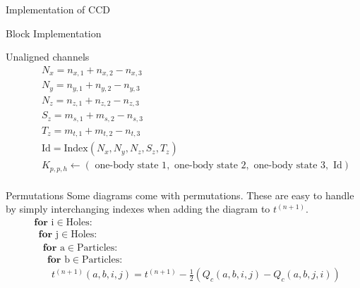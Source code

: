 \documentclass[twoside,english]{uiofysmaster}
\begin{document}
\begin{chapter}{Implementation of CCD}
\begin{section}{Block Implementation}
\begin{subsection}{Unaligned channels}
\begin{align*}
				&\:\:\:\:\:\:\:\: N_x = n_{x,1} + n_{x,2} - n_{x,3}\\
				&\:\:\:\:\:\:\:\: N_y = n_{y,1} + n_{y,2} - n_{y,3}\\
				&\:\:\:\:\:\:\:\: N_z = n_{z,1} + n_{z,2} - n_{z,3}\\
 				&\:\:\:\:\:\:\:\: S_z = m_{s,1} + m_{s,2} - n_{s,3}\\
				&\:\:\:\:\:\:\:\: T_z = m_{t,1} + m_{t,2} - n_{t,3}\\
				&\:\:\:\:\:\:\:\: \text{Id} = \text{Index}(N_x,N_y,N_z,S_z,T_z) \\
				&\:\:\:\:\:\:\:\: K_{p,p,h} \leftarrow (\text{ one-body state 1}, \text{ one-body state 2}, \text{ one-body state 3},  \text{ Id}) \\
			\end{align*}
		\end{subsection}

		\begin{subsection}{Permutations}
			Some diagrams come with permutations. These are easy to handle by simply interchanging indexes when adding the diagram to $t^{(n+1)}$. 
			\begin{align*}
				&\mathbf{for } \text{ i} \in \text{Holes}: \\
				&\:\:\mathbf{for } \text{ j} \in \text{Holes}: \\
				&\:\:\:\:\mathbf{for } \text{ a} \in \text{Particles}: \\
				&\:\:\:\:\:\:\mathbf{for } \text{ b} \in \text{Particles}: \\
				&\:\:\:\:\:\:\:\: t^{(n+1)}(a,b,i,j) = t^{(n+1)} - \frac{1}{2}\left(Q_c(a,b,i,j) - Q_c(a,b,j,i)\right)
			\end{align*}
		\end{subsection}

	\end{section}


\end{chapter}
\end{document}

